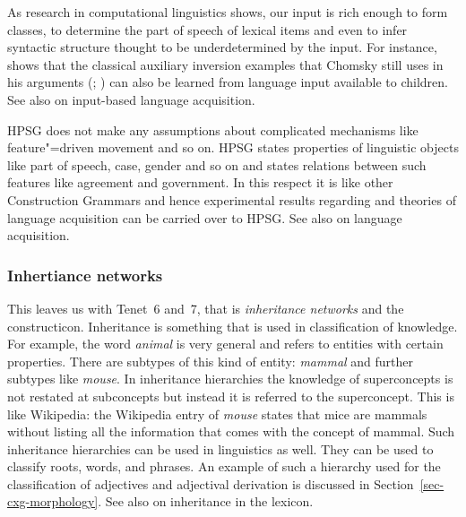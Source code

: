 \documentclass[output=paper]{langsci/langscibook}
\begin{document}
As research in computational linguistics shows, our input is rich
enough to form classes, to determine the part of speech of lexical items and even to infer syntactic
structure thought to be underdetermined by the input. For instance, \citet{Bod2009a} shows that the
classical auxiliary inversion examples that Chomsky still uses in his 
arguments (\citealp[--33]{Chomsky71a-u}; \citealp*{BPYC2011a}) can also be learned from language input available to children. See also
 on input-based language acquisition.

HPSG does not make any assumptions about complicated mechanisms like feature"=driven movement and so
on.
HPSG states properties of linguistic objects like part of speech, case, gender and so on and
states relations between such features like agreement and government. In this respect it is like
other Construction Grammars and hence experimental results regarding and theories of language
acquisition can be carried over to HPSG. See also  on language
acquisition.


\subsubsection{Inhertiance networks}
\label{sec-inheritance}

This leaves us with Tenet~6 and~7, that is \emph{inheritance networks} and the
constructicon. Inheritance is something that is used in classification of knowledge. For example,
the word \emph{animal} is very general and refers to entities with certain properties. There are
subtypes of this kind of entity: \emph{mammal} and further subtypes like \emph{mouse}. In inheritance
hierarchies the knowledge of superconcepts is not restated at subconcepts but instead it is referred
to the superconcept. This is like Wikipedia: the Wikipedia entry of \emph{mouse} states that mice
are mammals without listing all the information that comes with the concept of mammal. Such
inheritance hierarchies can be used in linguistics as well. They can be used to classify roots,
words, and phrases. An example of such a hierarchy used for the classification of adjectives and
adjectival derivation is discussed in Section~\ref{sec-cxg-morphology}. See also
 on inheritance in the lexicon.
 
\end{document}
